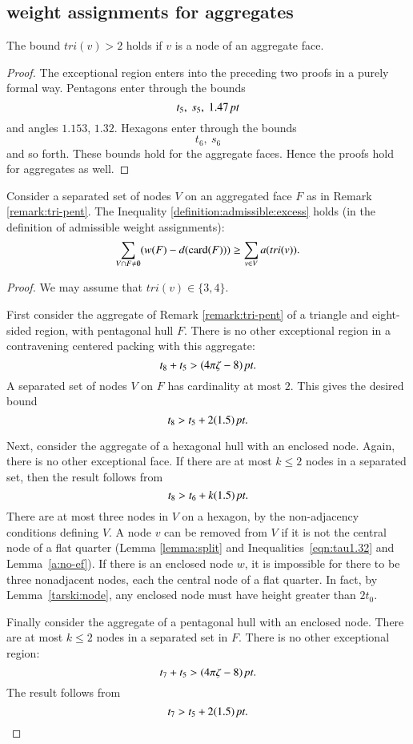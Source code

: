 
\subsection{weight assignments for aggregates}

\begin{lemma} The bound $tri(v)>2$ holds if $v$ is a node
of an aggregate face.
\end{lemma}

\begin{proof}
The exceptional region enters into the preceding two proofs in a
purely formal way.  Pentagons enter through the bounds
    $$t_5,\ s_5,\ 1.47\,\hbox{\it pt}$$
and angles $1.153$, $1.32$.  Hexagons enter through the bounds
    $$t_6,\ s_6$$
and so forth.  These bounds hold for the aggregate faces.  Hence the
proofs hold for aggregates as well.
\end{proof}

\begin{lemma}
Consider a separated set of nodes $V$ on an aggregated face $F$ as
in Remark \ref{remark:tri-pent}.  The Inequality
\ref{definition:admissible:excess} holds (in the definition of
admissible weight assignments):
    $$\sum_{V\cap F\ne\emptyset} (w(F) -d({\operatorname{card}}(F)))
            \ge \sum_{v\in V} a(tri(v)).$$
\end{lemma}

\begin{proof}
We may assume that $tri(v)\in\{3,4\}$.

First consider the aggregate of Remark \ref{remark:tri-pent} of a
triangle and eight-sided region, with pentagonal hull $F$. There
is no other exceptional region in a contravening centered packing
with this aggregate:
    $$t_8 + t_5 > (4\pi\zeta-8)\,\hbox{\it pt}.$$
A separated set of nodes $V$ on $F$ has cardinality at most $2$.
This gives the desired bound $$t_8 > t_5 + 2 (1.5)\,\hbox{\it pt}.$$

Next, consider the aggregate of a hexagonal hull with an enclosed
node.  Again, there is no other exceptional face. If there are at
most $k\le 2$ nodes in a separated set, then the result follows from
    $$t_8 > t_6 + k (1.5)\,\hbox{\it pt}.$$
There are at most three nodes in $V$ on a hexagon, by the
non-adjacency conditions defining $V$. A node $v$ can be removed
from $V$ if it is not the central node of a flat quarter (Lemma
\ref{lemma:split} and Inequalities~\ref{eqn:tau1.32} and
Lemma~\ref{a:no-ef}). If there is an enclosed node $w$, it is
impossible for there to be three nonadjacent nodes, each the central
node of a flat quarter.  In fact, by Lemma~\ref{tarski:node},
any enclosed node must have height greater than $2t_0$.



Finally consider the aggregate of a pentagonal hull with an enclosed
node.  There are at most $k\le2$ nodes in a separated set in $F$.
There is no other exceptional region:
    $$t_7 + t_5 > (4\pi\zeta-8)\,\hbox{\it pt}.$$
The result follows from
    $$t_7 > t_5 + 2(1.5)\,\hbox{\it pt}.$$
\end{proof}

